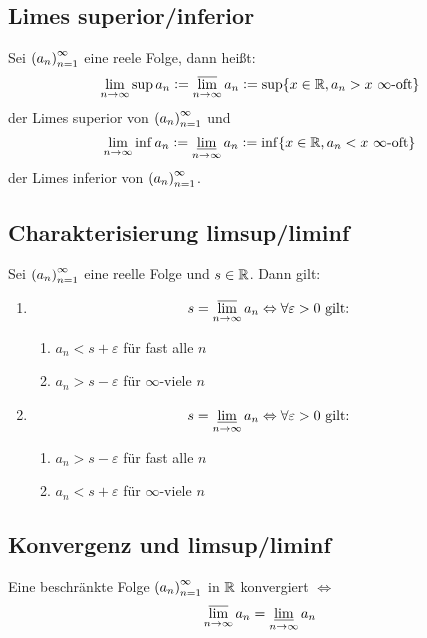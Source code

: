 \subsection{Limes superior/inferior}
Sei ${(a_n)}_{n=1}^\infty$ eine reele Folge, dann heißt:
\begin{equation*}
    \lim_{n \rightarrow \infty} \sup a_n :=
    \varlimsup_{n \rightarrow \infty} a_n :=
    \sup \{ x \in \mathbb{R}, a_n > x\ \infty\text{-oft}\}
\end{equation*}
der Limes superior von ${(a_n)}_{n=1}^\infty$ und
\begin{equation*}
    \lim_{n \rightarrow \infty} \inf a_n :=
    \varliminf_{n \rightarrow \infty} a_n :=
    \inf \{ x \in \mathbb{R}, a_n < x\ \infty\text{-oft}\}
\end{equation*}
der Limes inferior von ${(a_n)}_{n=1}^\infty$.

\subsection{Charakterisierung limsup/liminf}
Sei ${(a_n)}_{n=1}^\infty$ eine reelle Folge und $s \in \mathbb{R}$. Dann gilt:
\begin{enumerate}[label= (\alph*)]
    \item
        \begin{equation*}
            s = \varlimsup_{n \rightarrow \infty} a_n \Leftrightarrow
            \forall \varepsilon > 0 \text{ gilt: }
        \end{equation*}
        \begin{enumerate}[label=\roman*]
            \item $a_n < s + \varepsilon$ für fast alle $n$
            \item $a_n > s - \varepsilon$ für $\infty$-viele $n$
        \end{enumerate}
    \item
        \begin{equation*}
            s = \varliminf_{n \rightarrow \infty} a_n \Leftrightarrow
            \forall \varepsilon > 0 \text{ gilt: }
        \end{equation*}
        \begin{enumerate}[label=\roman*]
            \item $a_n > s - \varepsilon$ für fast alle $n$
            \item $a_n < s + \varepsilon$ für $\infty$-viele $n$
        \end{enumerate}
\end{enumerate}

\subsection{Konvergenz und limsup/liminf}
Eine beschränkte Folge ${(a_n)}_{n=1}^\infty$ in $\mathbb{R}$ konvergiert $\Leftrightarrow$
\begin{equation*}
     \varlimsup_{n \rightarrow \infty} a_n
    = \varliminf_{n \rightarrow \infty} a_n
\end{equation*}

